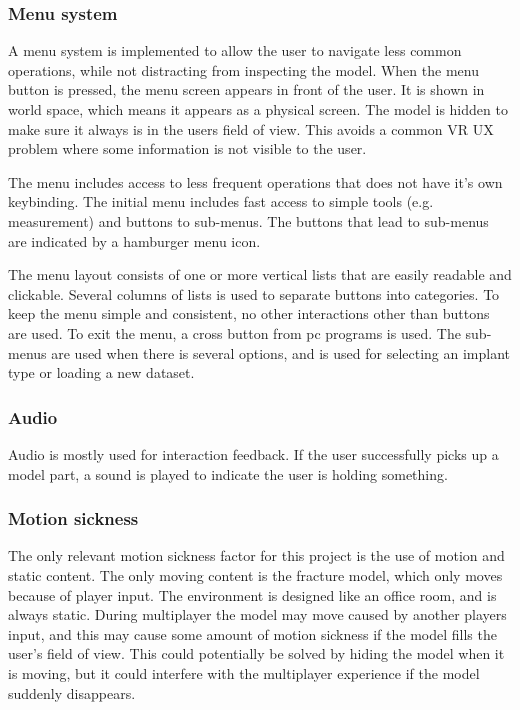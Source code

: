 \documentclass[a4paper]{report}
\begin{document}
\subsubsection{Menu system}
A menu system is implemented to allow the user to navigate less common operations, while not distracting from inspecting the model.
When the menu button is pressed, the menu screen appears in front of the user. It is shown in world space, which means it appears as a physical screen. The model is hidden to make sure it always is in the users field of view. This avoids a common VR UX problem where some information is not visible to the user.

The menu includes access to less frequent operations that does not have it's own keybinding. The initial menu includes fast access to simple tools (e.g. measurement) and buttons to sub-menus. The buttons that lead to sub-menus are indicated by a hamburger menu icon.

The menu layout consists of one or more vertical lists that are easily readable and clickable. Several columns of lists is used to separate buttons into categories. To keep the menu simple and consistent, no other interactions other than buttons are used. To exit the menu, a cross button from pc programs is used.
The sub-menus are used when there is several options, and is used for selecting an implant type or loading a new dataset.

\subsubsection{Audio}
Audio is mostly used for interaction feedback. If the user successfully picks up a model part, a sound is played to indicate the user is holding something.

\subsubsection{Motion sickness}
The only relevant motion sickness factor for this project is the use of motion and static content. The only moving content is the fracture model, which only moves because of player input. The environment is designed like an office room, and is always static.
During multiplayer the model may move caused by another players input, and this may cause some amount of motion sickness if the model fills the user's field of view. This could potentially be solved by hiding the model when it is moving, but it could interfere with the multiplayer experience if the model suddenly disappears.
\end{document}
